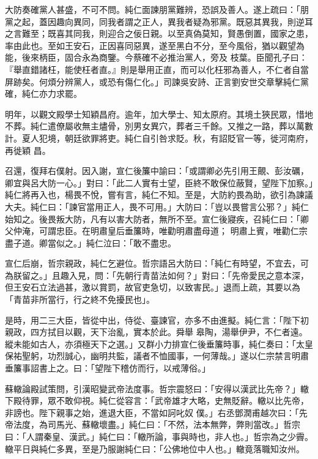 \begin{pinyinscope}
 大防奏確黨人甚盛，不可不問。純仁面諫朋黨難辨，恐誤及善人。遂上疏曰：「朋黨之起，蓋因趣向異同，同我者謂之正人，異我者疑為邪黨。既惡其異我，則逆耳之言難至；既喜其同我，則迎合之佞日親。以至真偽莫知，賢愚倒置，國家之患，率由此也。至如王安石，正因喜同惡異，遂至黑白不分，至今風俗，猶以觀望為能，後來柄臣，固合永為商鑒。今蔡確不必推治黨人，旁及
 枝葉。臣聞孔子曰：『舉直錯諸枉，能使枉者直。』則是舉用正直，而可以化枉邪為善人，不仁者自當屏跡矣。何煩分辨黨人，或恐有傷仁化。」司諫吳安詩、正言劉安世交章擊純仁黨確，純仁亦力求罷。



 明年，以觀文殿學士知穎昌府。逾年，加大學士、知太原府。其境土狹民眾，惜地不葬。純仁遣僚屬收無主燼骨，別男女異穴，葬者三千餘。又推之一路，葬以萬數計。夏人犯境，朝廷欲罪將吏。純仁自引咎求貶。秋，有詔貶官一等，徙河南府，再徙穎
 昌。



 召還，復拜右僕射。因入謝，宣仁後簾中諭曰：「或謂卿必先引用王覿、彭汝礪，卿宜與呂大防一心。」對曰：「此二人實有士望，臣終不敢保位蔽賢，望陛下加察。」純仁將再入也，楊畏不悅，嘗有言，純仁不知。至是，大防約畏為助，欲引為諫議大夫。純仁曰：「諫官當用正人，畏不可用。」大防曰：「豈以畏嘗言公邪？」純仁始知之。後畏叛大防，凡有以害大防者，無所不至。宣仁後寢疾，召純仁曰：「卿父仲淹，可謂忠臣。在明肅皇后垂簾時，唯勸明肅盡母道；
 明肅上賓，唯勸仁宗盡子道。卿當似之。」純仁泣曰：「敢不盡忠。



 宣仁后崩，哲宗親政，純仁乞避位。哲宗語呂大防曰：「純仁有時望，不宜去，可為朕留之。」且趣入見，問：「先朝行青苗法如何？」對曰：「先帝愛民之意本深，但王安石立法過甚，激以賞罰，故官吏急切，以致害民。」退而上疏，其要以為「青苗非所當行，行之終不免擾民也」。



 是時，用二三大臣，皆從中出，侍從、臺諫官，亦多不由進擬。純仁言：「陛下初親政，四方拭目以觀，天下治亂，實本於此。舜舉
 皋陶，湯舉伊尹，不仁者遠。縱未能如古人，亦須極天下之選。」又群小力排宣仁後垂簾時事，純仁奏曰：「太皇保祐聖躬，功烈誠心，幽明共監，議者不恤國事，一何薄哉。」遂以仁宗禁言明肅垂簾事詔書上之。曰：「望陛下稽仿而行，以戒薄俗。」



 蘇轍論殿試策問，引漢昭變武帝法度事。哲宗震怒曰：「安得以漢武比先帝？」轍下殿待罪，眾不敢仰視。純仁從容言：「武帝雄才大略，史無貶辭。轍以比先帝，非謗也。陛下親事之始，進退大臣，不當如訶叱奴
 僕。」右丞鄧潤甫越次曰：「先帝法度，為司馬光、蘇轍壞盡。」純仁曰：「不然，法本無弊，弊則當改。」哲宗曰：「人謂秦皇、漢武。」純仁曰：「轍所論，事與時也，非人也。」哲宗為之少霽。轍平日與純仁多異，至是乃服謝純仁曰：「公佛地位中人也。」轍竟落職知汝州。




\end{pinyinscope}
